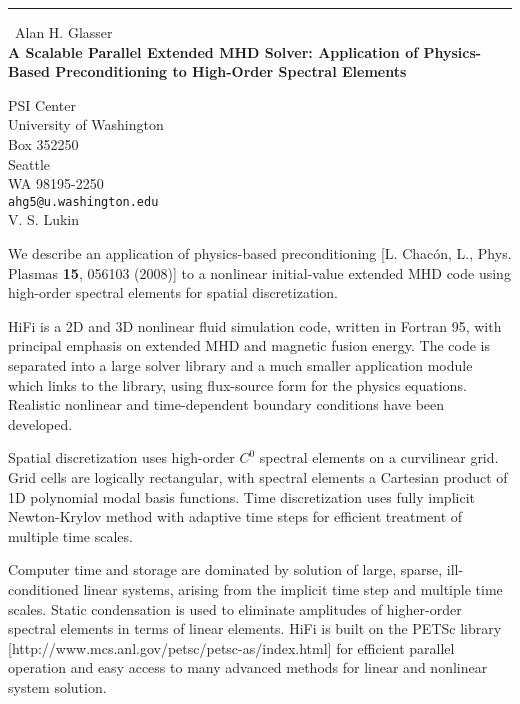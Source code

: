 \documentclass{report}
\begin{document}
\begin{center}
\rule{6in}{1pt} \
{\large Alan H. Glasser \\
{\bf A Scalable Parallel Extended MHD Solver: Application of Physics-Based Preconditioning to High-Order Spectral Elements}}

PSI Center \\ University of Washington \\ Box 352250 \\ Seattle \\ WA 98195-2250
\\
{\tt ahg5@u.washington.edu}\\
V. S. Lukin\end{center}

\renewcommand*{\v}[1]{\hbox{\bfseries #1}}
\renewcommand*{\t}[1]{\hbox{\sffamily\bfseries #1}}

We describe an application of physics-based preconditioning
[L. Chac\'on, L., Phys. Plasmas {\bf 15}, 056103 (2008)] to a nonlinear
initial-value extended MHD code using high-order spectral elements for
spatial discretization.

HiFi is a 2D and 3D nonlinear fluid simulation code, written in Fortran
95, with principal emphasis on extended MHD and magnetic fusion energy.
The code is separated into a large solver library and a much smaller
application module which links to the library, using flux-source form
for the physics equations. Realistic nonlinear and time-dependent
boundary conditions have been developed.

Spatial discretization uses high-order $C^0$ spectral elements on a
curvilinear grid. Grid cells are logically rectangular, with spectral
elements a Cartesian product of 1D polynomial modal basis functions.
Time discretization uses fully implicit Newton-Krylov method with
adaptive time steps for efficient treatment of multiple time scales.

Computer time and storage are dominated by solution of large, sparse,
ill-conditioned linear systems, arising from the implicit time step and
multiple time scales. Static condensation is used to eliminate
amplitudes of higher-order spectral elements in terms of linear
elements. HiFi is built on the PETSc library
[http://www.mcs.anl.gov/petsc/petsc-as/index.html] for efficient
parallel operation and easy access to many advanced methods for linear
and nonlinear system solution.
\end{document}
